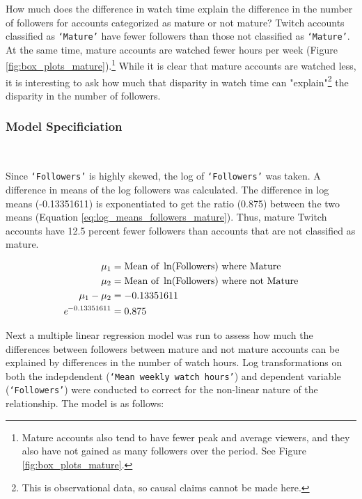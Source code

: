 \documentclass[12pt]{article}
\begin{document}
How much does the difference in watch time explain the difference in the number of followers for accounts categorized as mature or not mature? Twitch accounts classified as \texttt{`Mature'} have fewer followers than those not classified as \texttt{`Mature'}. At the same time, mature accounts are watched fewer hours per week (Figure \ref{fig:box_plots_mature}).\footnote{Mature accounts also tend to have fewer peak and average viewers, and they also have not gained as many followers over the period. See Figure \ref{fig:box_plots_mature}.} While it is clear that mature accounts are watched less, it is interesting to ask how much that disparity in watch time can "explain"\footnote{This is observational data, so causal claims cannot be made here.} the disparity in the number of followers.

\subsubsection{Model Specificiation}\

Since \texttt{`Followers'} is highly skewed, the log of \texttt{`Followers'} was taken. A difference in means of the log followers was calculated. The difference in log means (-0.13351611) is exponentiated to get the ratio (0.875) between the two means (Equation \ref{eq:log_means_followers_mature}). Thus, mature Twitch accounts have 12.5 percent fewer followers than accounts that are not classified as mature.

\begin{equation}
\begin{aligned}
\mu_{1} & = \text{Mean of } \ln(\text{Followers}) \text{ where Mature} \\
\mu_{2} & = \text{Mean of } \ln(\text{Followers}) \text{ where not Mature} \\
\mu_{1} - \mu_{2} & = -0.13351611 \\
\emph{e}^{-0.13351611} & = 0.875
\end{aligned}
\label{eq:log_means_followers_mature}
\end{equation}

Next a multiple linear regression model was run to assess how much the differences between followers between mature and not mature accounts can be explained by differences in the number of watch hours. Log transformations on both the indepdendent (\texttt{`Mean weekly watch hours'}) and dependent variable (\texttt{`Followers'}) were conducted to correct for the non-linear nature of the relationship. The model is as follows:
\end{document}
